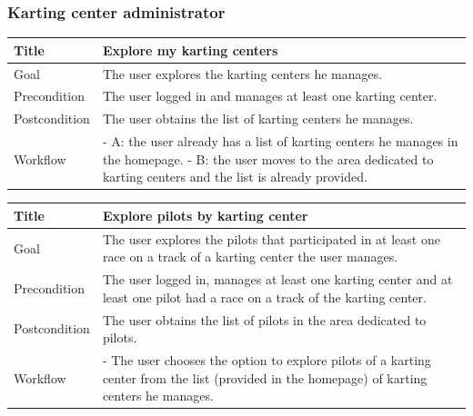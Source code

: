 \documentclass{beamer}
\begin{document}
\begin{frame}
    \frametitle{Karting center administrator}
    \begin{table}
        \tiny
        \begin{tabular}{|p{2cm}|p{6cm}|}
        \hline  
        Title & \textbf{Explore my karting centers} \\
        \hline
        Goal & The user explores the karting centers he manages. \\
        \hline
        Precondition & The user logged in and manages at least one karting center.\\
        \hline
        Postcondition & The user obtains the list of karting centers he manages. \\
        \hline
        Workflow &
        - A: the user already has a list of karting centers he manages in the homepage. \newline
        - B: the user moves to the area dedicated to karting centers and the list is already provided. \\
        \hline
        \end{tabular}
\end{table}

\begin{table}
    \tiny
    \begin{tabular}{|p{2cm}|p{6cm}|}
    \hline  
    Title & \textbf{Explore pilots by karting center} \\
    \hline
    Goal & The user explores the pilots that participated in at
    least one race on a track of a karting center the user manages. \\
    \hline
    Precondition & The user logged in, manages at least one karting center and at least one pilot
    had a race on a track of the karting center.\\
    \hline
    Postcondition & The user obtains the list of pilots in the area dedicated to pilots. \\
    \hline
    Workflow &
    - The user chooses the option to explore pilots of a karting center 
    from the list (provided in the homepage) of karting centers he manages. \\
    \hline
    \end{tabular}
\end{table}


\end{frame}
\end{document}
